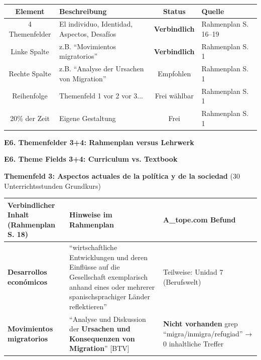 \documentclass[10pt,a4paper]{article}
\newcommand{\secbil}[2]{%
\vspace{6pt}
\noindent\colorbox{spaet}{\parbox{0.48\textwidth}{\color{white}\bfseries\small #1}}%
\hfill%
\colorbox{english}{\parbox{0.48\textwidth}{\color{white}\bfseries\small #2}}
\vspace{3pt}
}
\begin{document}
\begin{center}
\scriptsize
\begin{tabular}{|c|l|c|l|}
\hline
\rowcolor{lightgray}
\textbf{Element} & \textbf{Beschreibung} & \textbf{Status} & \textbf{Quelle} \\
\hline
4 Themenfelder & El individuo, Identidad, Aspectos, Desafíos & \textbf{Verbindlich} & Rahmenplan S. 16--19 \\
\hline
Linke Spalte & z.B. ``Movimientos migratorios'' & \textbf{Verbindlich} & Rahmenplan S. 1 \\
\hline
Rechte Spalte & z.B. ``Analyse der Ursachen von Migration'' & Empfohlen & Rahmenplan S. 1 \\
\hline
Reihenfolge & Themenfeld 1 vor 2 vor 3... & Frei wählbar & Rahmenplan S. 1 \\
\hline
20\% der Zeit & Eigene Gestaltung & Frei & Rahmenplan S. 1 \\
\hline
\end{tabular}
\end{center}

\vspace{3mm}

\secbil{E6. Themenfelder 3+4: Rahmenplan versus Lehrwerk}{E6. Theme Fields 3+4: Curriculum vs. Textbook}

\vspace{2mm}

\textbf{\textcolor{spanisch}{Themenfeld 3: Aspectos actuales de la política y de la sociedad}} (30 Unterrichtsstunden Grundkurs)

\vspace{1mm}

\begin{center}
\scriptsize
\begin{tabular}{|p{4cm}|p{5cm}|p{5cm}|}
\hline
\rowcolor{lightgray}
\textbf{Verbindlicher Inhalt (Rahmenplan S. 18)} & \textbf{Hinweise im Rahmenplan} & \textbf{A\_tope.com Befund} \\
\hline
\textbf{Desarrollos económicos} & ``wirtschaftliche Entwicklungen und deren Einflüsse auf die Gesellschaft exemplarisch anhand eines oder mehrerer spanischsprachiger Länder reflektieren'' & \textcolor{spaet}{Teilweise:} Unidad 7 (Berufswelt) \\
\hline
\rowcolor{lightred}
\textbf{Movimientos migratorios} & ``Analyse und Diskussion der \textbf{Ursachen und Konsequenzen von Migration}'' [BTV] & \textcolor{spanisch}{\textbf{Nicht vorhanden}} \newline grep ``migra/inmigra/refugiad'' → 0 inhaltliche Treffer \\
\hline
\end{tabular}
\end{center}
\end{document}

